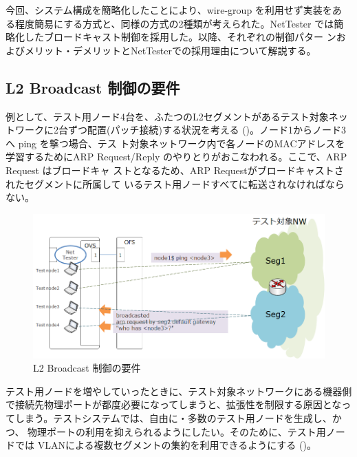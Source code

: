 今回、システム構成を簡略化したことにより、wire-group を利用せず実装をあ
る程度簡易にする方式と、\lopj 同様の方式の2種類が考えられた。NetTester
では簡略化したブロードキャスト制御を採用した。以降、それぞれの制御パター
ンおよびメリット・デメリットとNetTesterでの採用理由について解説する。

  \subsection{L2 Broadcast 制御の要件}
  \label{sec:l2bcctrl-requirement}

例として、テスト用ノード4台を、ふたつのL2セグメントがあるテスト対象ネッ
トワークに2台ずつ配置(パッチ接続)する状況を考える
()。ノード1からノード3へ ping を撃つ場合、テス
ト対象ネットワーク内で各ノードのMACアドレスを学習するためにARP
Request/Reply のやりとりがおこなわれる。ここで、ARP Request はブロードキャ
ストとなるため、ARP Requestがブロードキャストされたセグメントに所属して
いるテスト用ノードすべてに転送されなければならない。

\begin{figure}[h]
 \centering
 \includegraphics[scale=0.6]{img/l2bcctrl_req1.png}
 \caption{L2 Broadcast 制御の要件}
 \label{fig:l2bcctrl_req1}
\end{figure}

テスト用ノードを増やしていったときに、テスト対象ネットワークにある機器側
で接続先物理ポートが都度必要になってしまうと、拡張性を制限する原因となっ
てしまう。テストシステムでは、自由に・多数のテスト用ノードを生成し、かつ、
物理ポートの利用を抑えられるようにしたい。そのために、テスト用ノードでは
VLANによる複数セグメントの集約を利用できるようにする
()。

